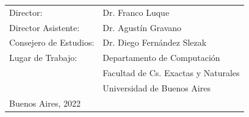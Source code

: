 {\large

    \begin{tabular}{l l}
        \vspace{.3cm} Director:              & Dr. Franco Luque                    \\
        \vspace{.3cm} Director Asistente:    & Dr. Agustín Gravano                 \\
        \vspace{.3cm} Consejero de Estudios: & Dr. Diego Fernández Slezak          \\
        Lugar de Trabajo:                    & Departamento de Computación         \\
                                             & Facultad de Cs. Exactas y Naturales \\
        \vspace{1cm}                         & Universidad de Buenos Aires         \\
        Buenos Aires, 2022                   &                                     \\
    \end{tabular}

    \vspace{.2cm}



    \vspace{.2cm}


}

\newpage\thispagestyle{empty}
